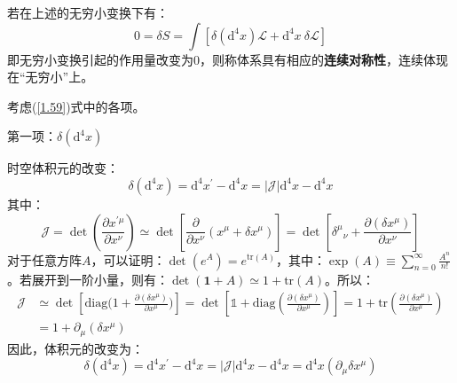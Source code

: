 \documentclass{book}
\begin{document}
若在上述的无穷小变换下有：
\begin{equation}
	0=\delta S=\int\left[\delta(\mathrm{d}^4x)\mathscr{L}+\mathrm{d}^4x\ \delta \mathscr{L}\right]
	\label{1.59}
\end{equation}
即无穷小变换引起的作用量改变为$0$，则称体系具有相应的\textbf{连续对称性}，连续体现在“无穷小”上。

考虑(\ref{1.59})式中的各项。

第一项：$\delta(\mathrm{d}^4 x)$

时空体积元的改变：
\begin{equation}
	\delta(\mathrm{d}^4 x)=\mathrm{d}^4x^\prime-\mathrm{d}^4 x=|\mathcal{J}|\mathrm{d}^4x-\mathrm{d}^4x
\end{equation}
其中：
\begin{equation}
	\mathcal{J}=\det\left(\frac{\partial x^{\prime\mu}}{\partial x^{\nu}}\right)\simeq\det\left[\frac{\partial}{\partial x^\nu}(x^\mu+\delta x^\mu)\right]=\det\left[\delta^{\mu}{}_{\nu}+\frac{\partial(\delta x^{\mu})}{\partial x^{\nu}}\right]
\end{equation}
对于任意方阵$A$，可以证明：$\det({e}^A)={e}^{\mathrm{tr}(A)}$，其中：$\exp(A)\equiv\sum_{n=0}^\infty\frac{A^n}{n!}$。若展开到一阶小量，则有：$\det(\mathbf{1}+A)\simeq1+\mathrm{tr}(A)$。所以：
\begin{equation}
	\begin{aligned}
		\mathcal{J}&\simeq\det\left[\mathrm{diag}\Big(1+\frac{\partial(\delta x^{\mu})}{\partial x^{\mu}}\Big)\right]=\det\left[\mathds{1}+\mathrm{diag}\left(\frac{\partial(\delta x^{\mu})}{\partial x^{\mu}}\right)\right]=1+\mathrm{tr}\left(\frac{\partial(\delta x^{\mu})}{\partial x^{\mu}} \right)\\&=1+\partial_\mu(\delta x^\mu)
	\end{aligned}
\end{equation}
因此，体积元的改变为：
\begin{equation}
	\delta(\mathrm{d}^4 x)=\mathrm{d}^4x^\prime-\mathrm{d}^4 x=|\mathcal{J}|\mathrm{d}^4x-\mathrm{d}^4x=\mathrm{d}^4 x(\partial_\mu\delta x^\mu)
\end{equation}
\end{document}
